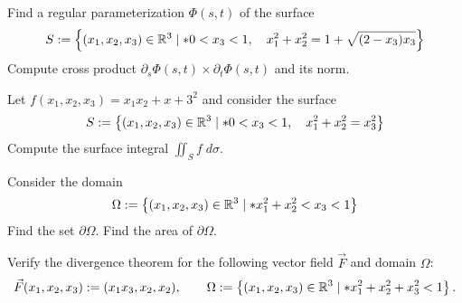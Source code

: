 \documentclass[11pt]{article}
\begin{document}
\begin{exercise}
    Find a regular parameterization $\Phi(s,t)$ of the surface 
    \begin{gather*}
        S := \left\{ (x_1,x_2,x_3) \in \mathbb R^3 \suchthat* 0 < x_3 < 1, \quad x_1^2 + x_2^2 = 1 + \sqrt{ ( 2 - x_3 ) x_3 } \right\}
    \end{gather*}
    Compute cross product $\partial_s \Phi(s,t) \times \partial_t \Phi(s,t)$ and its norm. 
\end{exercise}
\begin{solution}     
\end{solution}

\begin{exercise}
    Let $f(x_1,x_2,x_3) = x_1 x_2 + x+3^2$ and consider the surface 
    \begin{gather*}
        S := \left\{ (x_1,x_2,x_3) \in \mathbb R^3 \suchthat* 0 < x_3 < 1, \quad x_1^2 + x_2^2 = x_3^2 \right\}
    \end{gather*}
    Compute the surface integral $\iint_S f \;d\sigma$. 
\end{exercise}
\begin{solution}     
\end{solution}



\begin{exercise}
    Consider the domain 
    \begin{gather*}
        \Omega := \left\{ (x_1,x_2,x_3) \in \mathbb R^3 \suchthat* x_1^2 + x_2^2 < x_3 < 1 \right\}
    \end{gather*}
    Find the set $\partial\Omega$. Find the area of $\partial\Omega$. 
\end{exercise}
\begin{solution}     
\end{solution}


\begin{exercise}
    Verify the divergence theorem for the following vector field $\vec F$ and domain $\Omega$:
    \begin{gather*}
        \vec F(x_1,x_2,x_3) := ( x_1 x_3, x_2, x_2 ),
        \qquad 
        \Omega := \left\{ (x_1,x_2,x_3) \in \mathbb R^3 \suchthat* x_1^2 + x_2^2 + x_3^2 < 1 \right\}
        .
    \end{gather*}
\end{exercise}
\begin{solution}     
\end{solution}
\end{document}
